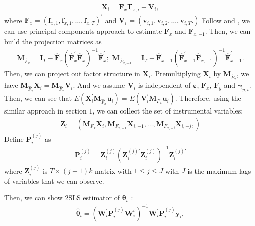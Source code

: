 \documentclass[12pt,a4paper,hyperref]{article}
\begin{document}
\begin{align}
\boldsymbol{X}_{i}=\boldsymbol{F}_{x}\boldsymbol{\Gamma}_{x,i}+\boldsymbol{V}_{i},
\end{align}
where $\boldsymbol{F}_{x}=\left( \boldsymbol{f}_{x,1}, \boldsymbol{f}_{x,1},\ldots,\boldsymbol{f}_{x,T} \right)^{'}$ and $\boldsymbol{V}_{i}=\left( \boldsymbol{v}_{i,1}, \boldsymbol{v}_{i,2},\ldots,\boldsymbol{v}_{i,T}.  \right)$
Follow \citet{bai:2003} and \citet{bai:2009}, we can use principal components approach to estimate $\boldsymbol{F}_{x}$ and $\boldsymbol{F}_{x,-1}$. Then, we can build the projection matrices as
\begin{align}
\boldsymbol{M}_{\hat{F}_{x}}=\boldsymbol{I}_{T}-\hat{\boldsymbol{F}}_{x}\left(\hat{\boldsymbol{F}}^{'}_{x} \hat{\boldsymbol{F}}_{x}   \right)^{-1}\hat{\boldsymbol{F}}^{'}_{x}; \,\, \boldsymbol{M}_{\hat{F}_{x,-1}}=\boldsymbol{I}_{T}-\hat{\boldsymbol{F}}_{x,-1}\left(\hat{\boldsymbol{F}}^{'}_{x,-1} \hat{\boldsymbol{F}}_{x,-1}   \right)^{-1}\hat{\boldsymbol{F}}^{'}_{x,-1}.
\end{align}
Then, we can project out factor structure in $\boldsymbol{X}_{i}$.  Premultiplying $\boldsymbol{X}_{i}$ by $\boldsymbol{M}_{\hat{F}_{x}}$, we have $\boldsymbol{M}_{\hat{F}_{x}}\boldsymbol{X}_{i}=\boldsymbol{M}_{\hat{F}_{x}}\boldsymbol{V}_{i}.$ And we assume $\boldsymbol{V}_{i}$ is independent of $\boldsymbol{\varepsilon}$, $\boldsymbol{F}_{x}$, $\boldsymbol{F}_{y}$ and $\boldsymbol{\gamma}_{y,i}$. Then, we can see that $E\left(\boldsymbol{X}^{'}_{i}\boldsymbol{M}_{\hat{F}_{x}}\boldsymbol{u}_{i} \right)=E\left(  \boldsymbol{V}_{i}^{'}\boldsymbol{M}_{F_{x}}\boldsymbol{u}_{i} \right).$
Therefore, using the similar approach in section $1$, we can collect the set of instrumental variables:
\begin{align}
\boldsymbol{Z}_{i}=\left( \boldsymbol{M}_{F_{x}}\boldsymbol{X}_{i}, \boldsymbol{M}_{F_{x,-1}}\boldsymbol{X}_{i,-1},\ldots  ,\boldsymbol{M}_{F_{x,-j}}\boldsymbol{X}_{i,-j}, \right)
\end{align}
Define $\boldsymbol{P}^{(j)}_{i}$ as
\begin{align}
\boldsymbol{P}^{(j)}_{i}=\boldsymbol{Z}^{(j)}_{i} \left(\boldsymbol{Z}^{(j)'}_{i}\boldsymbol{Z}^{(j)}_{i} \right)^{-1}\boldsymbol{Z}^{(j)'}_{i}
\end{align}
where $\boldsymbol{Z}^{(j)}_{i}$ is $T \times  (j+1)k$ matrix with $1\leq j \leq J$ with $J$ is the maximum lags of variables that we can observe.

Then, we can show 2SLS estimator of $\boldsymbol{\theta}_{i}$ :
\begin{align}
\hat{\boldsymbol{\theta}}_{i}= \left( \boldsymbol{W}^{'}_{i}\boldsymbol{P}^{(j)}_{i} \boldsymbol{W}^{b}_{i} \right)^{-1} \boldsymbol{W}^{'}_{i}\boldsymbol{P}^{(j)}_{i} \boldsymbol{y}_{i},
\end{align}
\end{document}
